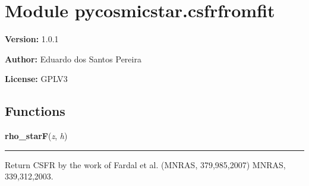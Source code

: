 %
%
%


\section{Module pycosmicstar.csfrfromfit}

    \label{pycosmicstar:csfrfromfit}
\textbf{Version:} 1.0.1



\textbf{Author:} Eduardo dos Santos Pereira



\textbf{License:} GPLV3





  \subsection{Functions}

    \label{pycosmicstar:csfrfromfit:rho_starF}

    \vspace{0.5ex}

\hspace{.8\funcindent}\begin{boxedminipage}{\funcwidth}

    \raggedright \textbf{rho\_starF}(\textit{z}, \textit{h})

    \vspace{-1.5ex}

    \rule{\textwidth}{0.5\fboxrule}
\setlength{\parskip}{2ex}
    Return CSFR by the work of Fardal et al. (MNRAS, 379,985,2007) MNRAS, 
    339,312,2003.

\setlength{\parskip}{1ex}
    \end{boxedminipage}

